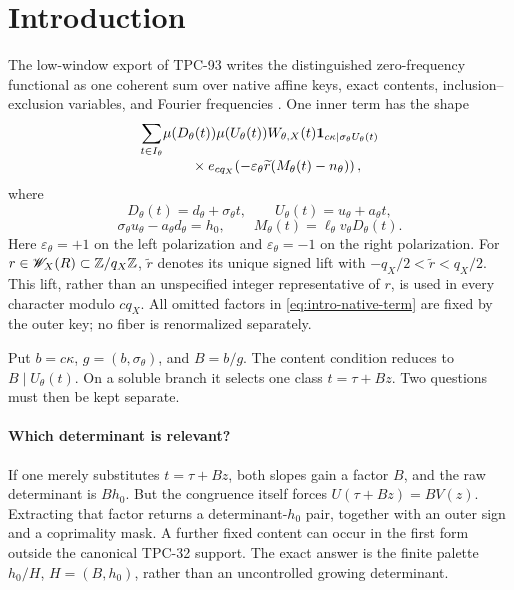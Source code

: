 \section{Introduction}
\label{sec:introduction}

The low-window export of TPC-93 writes the distinguished
zero-frequency functional as one coherent sum over native affine
keys, exact contents, inclusion--exclusion variables, and Fourier
frequencies \citep{WangTPC93}.  One inner term has the shape
\begin{align}
 \sum_{t\in I_\theta}
 &\mu(D_\theta(t))\mu(U_\theta(t))
 W_{\theta,X}(t)
 \mathbf 1_{c\kappa\mid\sigma_\theta U_\theta(t)}
\notag\\[-1mm]
 &\qquad\times
 e_{c q_X}\!\left(
 -\varepsilon_\theta\widetilde r
 (M_\theta(t)-n_\theta)\right),
\label{eq:intro-native-term}
\end{align}
where
\[
 D_\theta(t)=d_\theta+\sigma_\theta t,\qquad
 U_\theta(t)=u_\theta+a_\theta t,
\]
\[
 \sigma_\theta u_\theta-a_\theta d_\theta=h_0,
 \qquad
 M_\theta(t)=\ell_\theta v_\theta D_\theta(t).
\]
Here \(\varepsilon_\theta=+1\) on the left polarization and
\(\varepsilon_\theta=-1\) on the right polarization.  For
\(r\in\mathscr W_X(R)\subset\mathbb Z/q_X\mathbb Z\),
\(\widetilde r\) denotes its unique signed lift with
\(-q_X/2<\widetilde r<q_X/2\).  This lift, rather than an unspecified
integer representative of \(r\), is used in every character modulo
\(cq_X\).
All omitted factors in \eqref{eq:intro-native-term} are fixed by the
outer key; no fiber is renormalized separately.

Put \(b=c\kappa\), \(g=(b,\sigma_\theta)\), and \(B=b/g\).
The content condition reduces to \(B\mid U_\theta(t)\).  On a
soluble branch it selects one class \(t=\tau+Bz\).  Two questions
must then be kept separate.

\paragraph{Which determinant is relevant?}
If one merely substitutes \(t=\tau+Bz\), both slopes gain a factor
\(B\), and the raw determinant is \(Bh_0\).  But the congruence
itself forces \(U(\tau+Bz)=BV(z)\).  Extracting that factor returns a
determinant-\(h_0\) pair, together with an outer sign and a
coprimality mask.  A further fixed content can occur in the first
form outside the canonical TPC-32 support.  The exact answer is the
finite palette \(h_0/H\), \(H=(B,h_0)\), rather than an uncontrolled
growing determinant.

